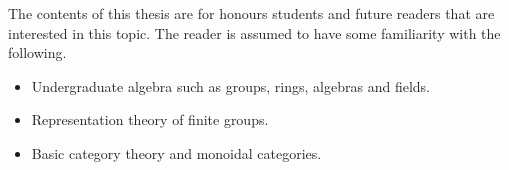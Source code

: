 The contents of this thesis are for honours students and future readers that are interested in this topic. The reader is assumed to have some familiarity with the following.

\begin{itemize}
    \item Undergraduate algebra such as groups, rings, algebras and fields.
    \item Representation theory of finite groups.
    \item Basic category theory and monoidal categories.
\end{itemize}




